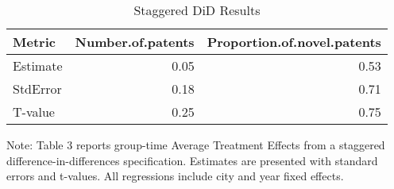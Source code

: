\documentclass[12pt]{article}
\begin{document}
\begin{table}[ht]
\centering
\caption{Staggered DiD Results} 
\label{tab:stag_did}
\begin{tabular}{lrr}
  \hline
Metric & Number.of.patents & Proportion.of.novel.patents \\ 
  \hline
Estimate & 0.05 & 0.53 \\ 
  StdError & 0.18 & 0.71 \\ 
  T-value & 0.25 & 0.75 \\ 
   \hline
\end{tabular}
\end{table}
\vspace{20cm}
\noindent\footnotesize Note: Table 3 reports group-time Average Treatment Effects from a staggered difference-in-differences specification. Estimates are presented with standard errors and t-values. All regressions include city and year fixed effects.
\end{document}
